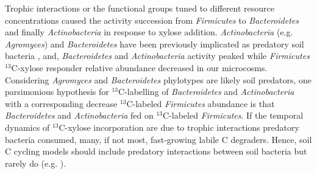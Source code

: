 Trophic interactions or the functional groups tuned to different resource
concentrations caused the activity succession from \textit{Firmicutes} to
\textit{Bacteroidetes} and finally \textit{Actinobacteria} in response to
xylose addition. \textit{Actinobacteria} (e.g. \textit{Agromyces}) and
\textit{Bacteroidetes} have been previously implicated as predatory soil
bacteria \citep{Lueders2006,16346402}, and, \textit{Bacteroidetes} and
\textit{Actinobacteria} activity peaked while \textit{Firmicutes}
$^{13}$C-xylose responder relative abundance decreased in our microcosms.
Considering \textit{Agromyces} and \textit{Bacteroidetes} phylotypes are
likely soil predators, one parsimonious hypothesis for 
$^{13}$C-labelling of \textit{Bacteroidetes} and \textit{Actinobacteria}
with a corresponding decrease $^{13}$C-labeled \textit{Firmicutes}
abundance is that \textit{Bacteroidetes} and \textit{Actinobacteria}
fed on $^{13}$C-labeled \textit{Firmicutes}. If the temporal dynamics of
$^{13}$C-xylose incorporation are due to trophic interactions predatory
bacteria consumed, many, if not most, fast-growing labile C degraders.
Hence, soil C cycling models should include predatory interactions between
soil bacteria but rarely do (e.g. \citep{Moore1988}).

